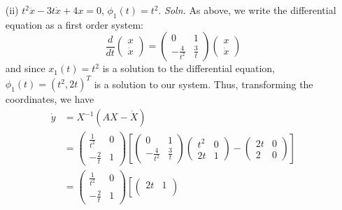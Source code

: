 \documentclass{article}
\begin{document}
\begin{itemize}
\begin{itemize}
        \item[(ii)] $t^2\ddot{x} - 3t\dot{x} + 4x = 0$, $\phi_1(t) = t^2$.
        \newline\newline
        \textit{Soln.} As above, we write the differential equation as a first order system:
        \[\frac{d}{dt}\begin{pmatrix}
            x\\
            \dot{x}
        \end{pmatrix} = \begin{pmatrix}
            0 & 1\\
            -\tfrac{4}{t^2} & \tfrac{3}{t}
        \end{pmatrix}\begin{pmatrix}
            x\\
            \dot{x}
        \end{pmatrix}\]
        and since $x_1(t) = t^2$ is a solution to the differential equation, $\phi_1(t) = (t^2, 2t)^T$ is a solution to our system. Thus, transforming the coordinates, we have
        \begin{align*}
            \dot{y} &= X^{-1}(AX - \dot{X})\\
            &= \begin{pmatrix}
                \tfrac{1}{t^2} & 0\\
                -\tfrac{2}{t} & 1
            \end{pmatrix}\left[\begin{pmatrix}
                0 & 1\\
                -\tfrac{4}{t^2} & \tfrac{3}{t}
            \end{pmatrix}\begin{pmatrix}
                t^2 & 0\\
                2t & 1
            \end{pmatrix} - \begin{pmatrix}
                2t & 0\\
                2 & 0
            \end{pmatrix}\right]\\
            &= \begin{pmatrix}
                \tfrac{1}{t^2} & 0\\
                -\tfrac{2}{t} & 1
            \end{pmatrix}\left[\begin{pmatrix}
                2t & 1\\

\end{pmatrix}
\end{align*}
\end{itemize}
\end{itemize}
\end{document}
